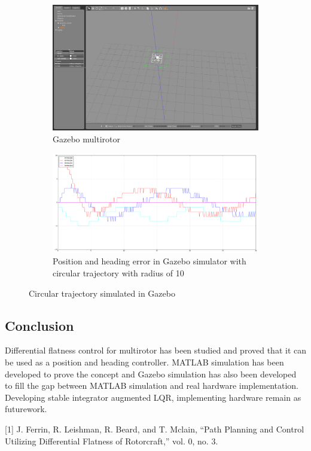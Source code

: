 \documentclass{article}
\begin{document}
\begin{figure}[h!]
	\centering
	\begin{subfigure}{.5\textwidth}
		\centering
		\includegraphics[width=0.9\linewidth]{gazebo1.png}
		\caption{Gazebo multirotor}
		\label{gazebo1}
	\end{subfigure}%
	\begin{subfigure}{.5\textwidth}
		\centering
		\includegraphics[width=1.0\linewidth]{gazebo2.png}
		\caption{Position and heading error in Gazebo simulator with circular trajectory with radius of 10}
		\label{gazebo2}
	\end{subfigure}
	\caption{Circular trajectory simulated in Gazebo}
	\label{gazebo}
\end{figure}


\subsection*{Conclusion}
Differential flatness control for multirotor has been studied and proved that it can be used as a position and heading controller. MATLAB simulation has been developed to prove the concept and Gazebo simulation has also been developed to fill the gap between MATLAB simulation and real hardware implementation. Developing stable integrator augmented LQR, implementing hardware remain as futurework. 


\begin{thebibliography}{9}
	
[1] J. Ferrin, R. Leishman, R. Beard, and T. Mclain, “Path Planning and Control Utilizing Differential Flatness of Rotorcraft,” vol. 0, no. 3.

\end{thebibliography}
\end{document}
